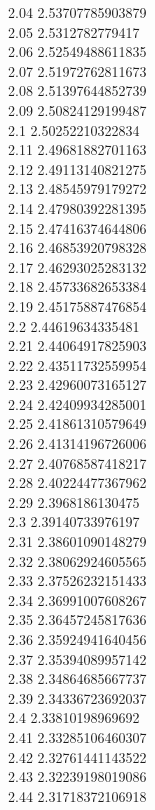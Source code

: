 {2.04	2.53707785903879\\
2.05	2.5312782779417\\
2.06	2.52549488611835\\
2.07	2.51972762811673\\
2.08	2.51397644852739\\
2.09	2.50824129199487\\
2.1	2.50252210322834\\
2.11	2.49681882701163\\
2.12	2.49113140821275\\
2.13	2.48545979179272\\
2.14	2.47980392281395\\
2.15	2.47416374644806\\
2.16	2.46853920798328\\
2.17	2.46293025283132\\
2.18	2.45733682653384\\
2.19	2.45175887476854\\
2.2	2.44619634335481\\
2.21	2.44064917825903\\
2.22	2.43511732559954\\
2.23	2.42960073165127\\
2.24	2.42409934285001\\
2.25	2.41861310579649\\
2.26	2.41314196726006\\
2.27	2.40768587418217\\
2.28	2.40224477367962\\
2.29	2.3968186130475\\
2.3	2.39140733976197\\
2.31	2.38601090148279\\
2.32	2.38062924605565\\
2.33	2.37526232151433\\
2.34	2.36991007608267\\
2.35	2.36457245817636\\
2.36	2.35924941640456\\
2.37	2.35394089957142\\
2.38	2.34864685667737\\
2.39	2.34336723692037\\
2.4	2.33810198969692\\
2.41	2.33285106460307\\
2.42	2.32761441143522\\
2.43	2.32239198019086\\
2.44	2.31718372106918\\
}
